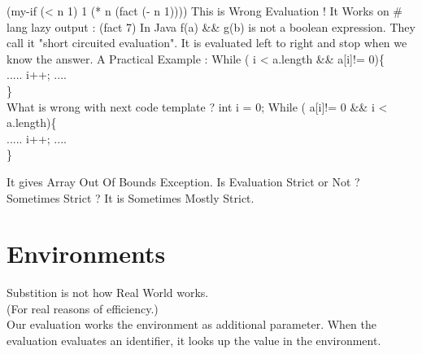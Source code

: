 \documentclass{article}
\begin{document}
 (my-if (< n 1) 1 (* n (fact (- n 1))))
 \newline
 This is Wrong Evaluation !
 \newline
 \newline
 It Works on \# lang lazy 
 \newline 
 \newline
 output : 
 \newline
 \newline
 (fact 7) 
 \newline 
 \newline
 In Java f(a) \&\& g(b) is not a boolean expression.
 \newline \newline
 They call it "short circuited evaluation". 
 It is evaluated left to right and stop when we know the answer.
 \newline
 \newline
\newline 
A Practical Example :
\newline
\newline 
While ( i < a.length \&\& a[i]!= 0)\{ \\
    ..... i++; .... \\
    \} \\
\newline
\newline
What is wrong with next code template ?
\newline \newline
int i = 0;
\newline
While ( a[i]!= 0 \&\& i < a.length)\{ \\ 
    ..... i++; .... \\
    \}
\newline
\newline

It gives Array Out Of Bounds Exception.
\newline
\newline
Is Evaluation Strict or Not ? Sometimes Strict ?
\newline
\newline
It is Sometimes Mostly Strict.
\newpage
\section{Environments}

 Substition is not how Real World works. \\
 (For real reasons of efficiency.) \\
\newline
\newline
Our evaluation works the environment as additional parameter. When the evaluation evaluates an identifier, it looks up the value in the environment.
\newline
\newline
\end{document}
